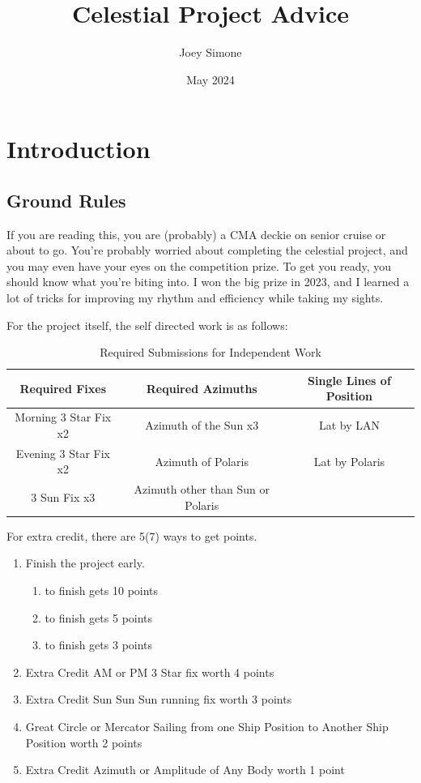 \documentclass[letterpaper,12pt]{article}
\title{Celestial Project Advice}
\author{Joey Simone}
\date{May 2024}
\begin{document}
\maketitle
\tableofcontents
\section{Introduction}
\subsection{Ground Rules}
If you are reading this, you are (probably) a CMA deckie on senior cruise or about to go. You're probably worried about completing the celestial project, and you may even have your eyes on the competition prize. To get you ready, you should know what you're biting into. I won the big prize in 2023, and I learned a lot of tricks for improving my rhythm and efficiency while taking my sights.

For the project itself, the self directed work is as follows:


\begin{table}[htbp]
    \centering
    \begin{tabular}{|c|c|c|}
    \hline
        Required Fixes & Required Azimuths & Single Lines of Position\\
        \hline
        Morning 3 Star Fix x2 & Azimuth of the Sun x3\footnotemark{} & Lat by LAN\\
        Evening 3 Star Fix x2 & Azimuth of Polaris & Lat by Polaris \\
        3 Sun Fix x3 & Azimuth other than Sun or Polaris & \\
        \hline
    \end{tabular}
    \caption{Required Submissions for Independent Work}
    \label{tab:solo}
\end{table}
For extra credit, there are 5(7) ways to get points.
\begin{enumerate}
    \item Finish the project early. \begin{enumerate}
        \item {} to finish gets 10 points
        \item {} to finish gets 5 points
        \item {} to finish gets 3 points
    \end{enumerate}
    \item Extra Credit AM or PM 3 Star fix worth 4 points
    \item Extra Credit Sun Sun Sun running fix worth 3 points
    \item Great Circle or Mercator Sailing from one Ship Position to Another Ship Position worth 2 points
    \item Extra Credit Azimuth or Amplitude of Any Body worth 1 point
\end{enumerate}
\end{document}
